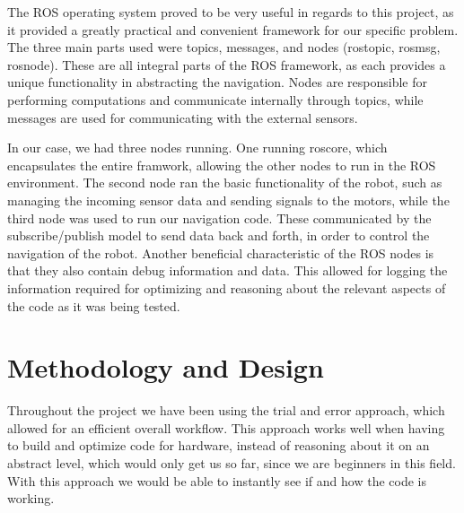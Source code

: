 \documentclass[conference]{IEEEtran}
\begin{document}
The ROS operating system proved to be very useful in regards to this project, as it provided a greatly practical and convenient framework for our specific problem.
The three main parts used were topics, messages, and nodes (rostopic, rosmsg, rosnode). These are all integral parts of the ROS framework, as each provides a unique functionality in abstracting the navigation.
Nodes are responsible for performing computations and communicate internally through topics, while messages are used for communicating with the external sensors.

In our case, we had three nodes running. One running roscore, which encapsulates the entire framwork, allowing the other nodes to run in the ROS environment.
The second node ran the basic functionality of the robot, such as managing the incoming sensor data and sending signals to the motors, while the third node was used to run our navigation code.
These communicated by the subscribe/publish model to send data back and forth, in order to control the navigation of the robot.
Another beneficial characteristic of the ROS nodes is that they also contain debug information and data. This allowed for logging the information required for optimizing and reasoning about the relevant aspects of the code as it was being tested.

\section{Methodology and Design}
Throughout the project we have been using the trial and error approach, which allowed for an efficient overall workflow. 
This approach works well when having to build and optimize code for hardware, instead of reasoning about it on an abstract level, which would only get us so far, since we are beginners in this field.
With this approach we would be able to instantly see if and how the code is working.
\end{document}
